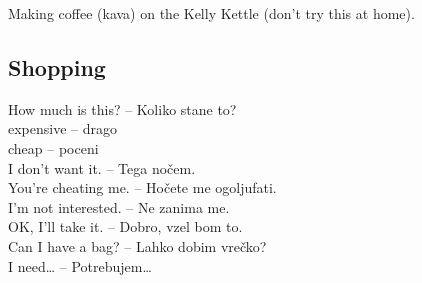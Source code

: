 \begin{marginfigure}
\checkoddpage \ifoddpage \forcerectofloat \else \forceversofloat \fi
\centering
 \caption{Making coffee (kava) on the Kelly Kettle (don't try this at home). }
 \label{kava}
\end{marginfigure}


\subsection{Shopping}

How much is this?  -- Koliko stane to?\\
expensive  -- drago\\
cheap  -- poceni\\
I don't want it.  -- Tega nočem.\\
You're cheating me.  -- Hočete me ogoljufati.\\
I'm not interested.  -- Ne zanima me.\\
OK, I'll take it.  -- Dobro, vzel bom to.\\
Can I have a bag?  -- Lahko dobim vrečko?\\
I need\ldots{}  -- Potrebujem\ldots{}\\


